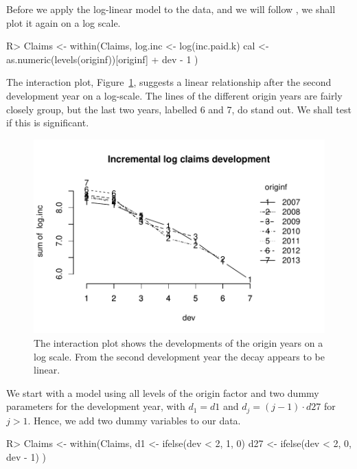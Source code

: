 \documentclass{article}
\begin{document}
Before we apply the log-linear model to the data, and we will follow 
\cite{Christofides1997}, we shall plot it again on a log scale.
\begin{Schunk}
\begin{Sinput}
R> Claims <- within(Claims, {
       log.inc <- log(inc.paid.k)
       cal <- as.numeric(levels(originf))[originf] + dev - 1
   })
\end{Sinput}
\end{Schunk}
The interaction plot, Figure~\ref{fig:adjusteddata}, suggests a linear 
relationship  after the second development year on a log-scale. The 
lines of the different origin years are fairly closely group, but the 
last two years, labelled 6 and 7, do stand out. 
We shall test if this is significant.
\begin{figure}[thb]
\begin{center}
\includegraphics{Log-incremental-019}
\caption{The interaction plot shows the developments of the origin years on a 
log scale. From the second development year the decay appears to be linear.
}\label{fig:adjusteddata}
\end{center}
\end{figure}
We start with a model using all levels of the origin factor 
and two dummy parameters for the development year, with $d_1=d1$ and
$d_j = (j - 1) \cdot d27$ for $j>1$.  
Hence, we add two dummy variables to 
our data.
\begin{Schunk}
\begin{Sinput}
R> Claims <- within(Claims, { 
     d1 <- ifelse(dev < 2, 1, 0)
     d27 <- ifelse(dev < 2, 0, dev - 1)
   })        
\end{Sinput}
\end{Schunk}
\end{document}
